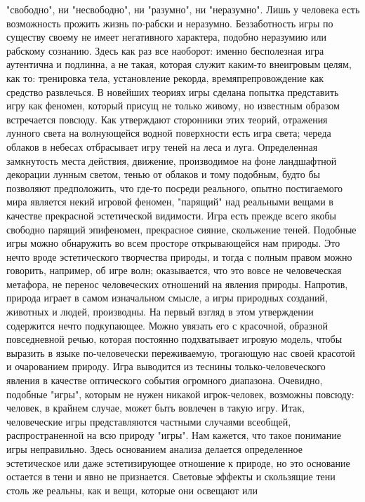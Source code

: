 \documentclass[12pt]{article}
\begin{document}
"свободно", ни "несвободно", ни "разумно", ни "неразумно". Лишь у человека есть возможность прожить жизнь
по-рабски и неразумно. Беззаботность игры по существу своему не имеет негативного характера, подобно
неразумию  или  рабскому  сознанию.  Здесь  как  раз  все  наоборот:  именно  бесполезная  игра  аутентична  и
подлинна, а не такая,  которая служит  каким-то  внеигровым  целям, как  то:  тренировка тела, установление
рекорда,  времяпрепровождение  как  средство  развлечься.  В  новейших  теориях  игры  сделана  попытка
представить игру как феномен, который присущ не только живому, но известным образом встречается повсюду.
Как утверждают сторонники этих теорий, отражения лунного света на волнующейся водной поверхности есть
игра света; череда облаков в небесах отбрасывает игру теней на леса и луга. Определенная замкнутость места
действия, движение, производимое на фоне ландшафтной декорации лунным светом, тенью от облаков и тому
подобным,  будто  бы  позволяют  предположить,  что  где-то  посреди  реального,  опытно  постигаемого  мира
является  некий  игровой  феномен,  "парящий"  над  реальными  вещами  в  качестве  прекрасной  эстетической
видимости. Игра есть прежде всего якобы свободно парящий эпифеномен, прекрасное сияние, скольжение
теней. Подобные игры можно обнаружить во всем просторе открывающейся нам природы. Это нечто вроде
эстетического  творчества  природы,  и  тогда  с  полным  правом  можно  говорить,  например,  об  игре  волн;
оказывается, что это вовсе не человеческая метафора, не перенос человеческих отношений на явления природы.
Напротив, природа играет в самом изначальном смысле, а игры природных созданий, животных и людей,
производны. На первый взгляд в этом утверждении содержится нечто подкупающее. Можно увязать его с
красочной, образной повседневной речью, которая постоянно подхватывает игровую модель, чтобы выразить в
языке по-человечески переживаемую, трогающую нас своей красотой и очарованием природу. Игра выводится
из теснины
только-человеческого  явления  в  качестве  оптического  события  огромного  диапазона.  Очевидно,  подобные
"игры", которым не нужен никакой игрок-человек, возможны повсюду: человек, в крайнем случае, может быть
вовлечен  в  такую  игру.  Итак,  человеческие  игры  представляются  частными  случаями  всеобщей,
распространенной на всю природу "игры".
Нам  кажется,  что  такое  понимание  игры  неправильно.  Здесь  основанием  анализа  делается  определенное
эстетическое или даже эстетизирующее отношение к природе, но это основание остается в тени и явно не
признается. Световые эффекты и скользящие тени столь же реальны, как и вещи, которые они освещают или
\end{document}
